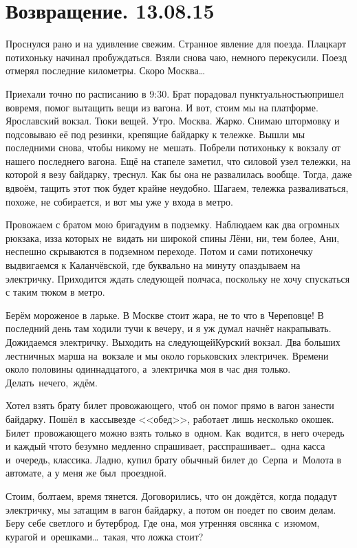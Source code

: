 \chapter{Возвращение. 13.08.15}

Проснулся рано и на удивление свежим. Странное явление для поезда. Плацкарт потихоньку начинал пробуждаться. Взяли снова чаю, немного перекусили. Поезд отмерял последние километры. Скоро Москва\ldots~

Приехали точно по расписанию в 9:30. Брат порадовал пунктуальностью\mdash пришел вовремя, помог вытащить вещи из вагона. И вот, стоим мы на платформе. Ярославский вокзал. Тюки вещей. Утро. Москва. Жарко. Снимаю штормовку и подсовываю её под резинки, крепящие байдарку к тележке. Вышли мы последними снова, чтобы никому не~мешать. Побрели потихоньку к вокзалу от нашего последнего вагона. Ещё на стапеле заметил, что силовой узел тележки, на которой я везу байдарку, треснул. Как бы она не развалилась вообще. Тогда, даже вдвоём, тащить этот тюк будет крайне неудобно. Шагаем, тележка разваливаться, похоже, не собирается, и вот мы уже у входа в метро. 

Провожаем с братом мою бригаду\mdash им в подземку. Наблюдаем как два огромных рюкзака, из\sdash за которых не~видать ни широкой спины Лёни, ни, тем более, Ани, неспешно скрываются в подземном переходе. Потом и сами потихонечку выдвигаемся к Каланчёвской, где буквально на минуту опаздываем на электричку. Приходится ждать следующей полчаса, поскольку не хочу спускаться с таким тюком в метро. 

Берём мороженое в ларьке. В Москве стоит жара, не то что в Череповце! В последний день там ходили тучи к вечеру, и я уж думал начнёт накрапывать. Дожидаемся электричку. Выходить на следующей\mdash Курский вокзал. Два больших лестничных марша на~вокзале и мы около горьковских электричек. Времени около половины одиннадцатого, а~электричка моя в час дня только. Делать~нечего,~ждём. 

Хотел взять брату билет провожающего, чтоб он помог прямо в вагон занести байдарку. Пошёл в~кассы\mdash везде <<обед>>, работает лишь несколько окошек. Билет~провожающего можно взять только в~одном. Как~водится, в него очередь и каждый что\sdash то безумно медленно спрашивает, расспрашивает\ldots~одна касса и~очередь, классика. Ладно, купил брату обычный билет до~Серпа~и~Молота в автомате, а у меня же был~проездной. 

Стоим, болтаем, время тянется. Договорились, что он дождётся, когда подадут электричку, мы затащим в вагон байдарку, а потом он поедет по своим делам. Беру себе светлого и бутерброд. Где она, моя утренняя овсянка с~изюмом, курагой и~орешками\ldots~такая, что ложка стоит? 

